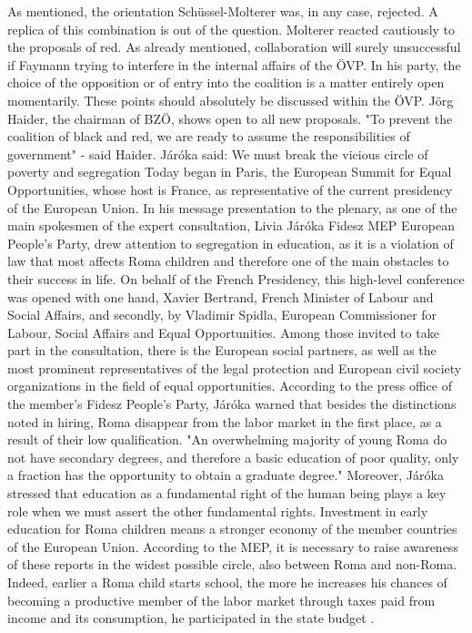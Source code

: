 As mentioned, the orientation Schüssel-Molterer was, in any case, rejected.
A replica of this combination is out of the question.
Molterer reacted cautiously to the proposals of red.
As already mentioned, collaboration will surely unsuccessful if Faymann trying to interfere in the internal affairs of the ÖVP.
In his party, the choice of the opposition or of entry into the coalition is a matter entirely open momentarily. These points should absolutely be discussed within the ÖVP.
Jörg Haider, the chairman of BZÖ, shows open to all new proposals.
"To prevent the coalition of black and red, we are ready to assume the responsibilities of government" - said Haider.
Járóka said: We must break the vicious circle of poverty and segregation
Today began in Paris, the European Summit for Equal Opportunities, whose host is France, as representative of the current presidency of the European Union.
In his message presentation to the plenary, as one of the main spokesmen of the expert consultation, Livia Járóka Fidesz MEP European People's Party, drew attention to segregation in education, as it is a violation of law that most affects Roma children and therefore one of the main obstacles to their success in life.
On behalf of the French Presidency, this high-level conference was opened with one hand, Xavier Bertrand, French Minister of Labour and Social Affairs, and secondly, by Vladimir Spidla, European Commissioner for Labour, Social Affairs and Equal Opportunities.
Among those invited to take part in the consultation, there is the European social partners, as well as the most prominent representatives of the legal protection and European civil society organizations in the field of equal opportunities.
According to the press office of the member's Fidesz People's Party, Járóka warned that besides the distinctions noted in hiring, Roma disappear from the labor market in the first place, as a result of their low qualification.
"An overwhelming majority of young Roma do not have secondary degrees, and therefore a basic education of poor quality, only a fraction has the opportunity to obtain a graduate degree."
Moreover, Járóka stressed that education as a fundamental right of the human being plays a key role when we must assert the other fundamental rights.
Investment in early education for Roma children means a stronger economy of the member countries of the European Union.
According to the MEP, it is necessary to raise awareness of these reports in the widest possible circle, also between Roma and non-Roma.
Indeed, earlier a Roma child starts school, the more he increases his chances of becoming a productive member of the labor market through taxes paid from income and its consumption, he participated in the state budget .
